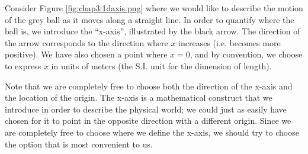 Consider Figure \ref{fig:chap3:1daxis.png} where we would like to describe the motion of the grey ball as it moves along a straight line. In order to quantify where the ball is, we introduce the ``x-axis'', illustrated by the black arrow. The direction of the arrow corresponds to the direction where $x$ increases (i.e. becomes more positive). We have also chosen a point where $x=0$, and by convention, we choose to express $x$ in units of meters (the S.I. unit for the dimension of length).

Note that we are completely free to choose both the direction of the x-axis and the location of the origin. The x-axis is a mathematical construct that we introduce in order to describe the physical world; we could just as easily have chosen for it to point in the opposite direction with a different origin. Since we are completely free to choose where we define the x-axis, we should try to choose the option that is most convenient to us. 

